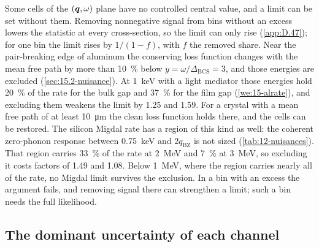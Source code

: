 Some cells of the $(\bm{q},\omega)$ plane have no controlled central value, and a limit can be set without them. Removing nonnegative signal from bins without an excess lowers the statistic at every cross-section, so the limit can only rise (\cref{app:D.47}); for one bin the limit rises by $1/(1 - f)$, with $f$ the removed share. Near the pair-breaking edge of aluminum the conserving loss function changes with the mean free path by more than \SI{10}{\percent} below $y = \omega/\Delta_{\mathrm{BCS}} = 3$, and those energies are excluded (\cref{sec:15.2-nuisance}). At \SI{1}{keV} with a light mediator those energies hold \SI{20}{\percent} of the rate for the bulk gap and \SI{37}{\percent} for the film gap (\cref{we:15-alrate}), and excluding them weakens the limit by 1.25 and 1.59. For a crystal with a mean free path of at least \SI{10}{\micro m} the clean loss function holds there, and the cells can be restored. The silicon Migdal rate has a region of this kind as well: the coherent zero-phonon response between \SI{0.75}{keV} and $2q_{\mathrm{BZ}}$ is not sized (\cref{tab:12-nuisances}). That region carries \SI{33}{\percent} of the rate at \SI{2}{MeV} and \SI{7}{\percent} at \SI{3}{MeV}, so excluding it costs factors of 1.49 and 1.08. Below \SI{1}{MeV}, where the region carries nearly all of the rate, no Migdal limit survives the exclusion. In a bin with an excess the argument fails, and removing signal there can strengthen a limit; such a bin needs the full likelihood.

\subsection{The dominant uncertainty of each channel}\label{sec:21.4-dominant}

